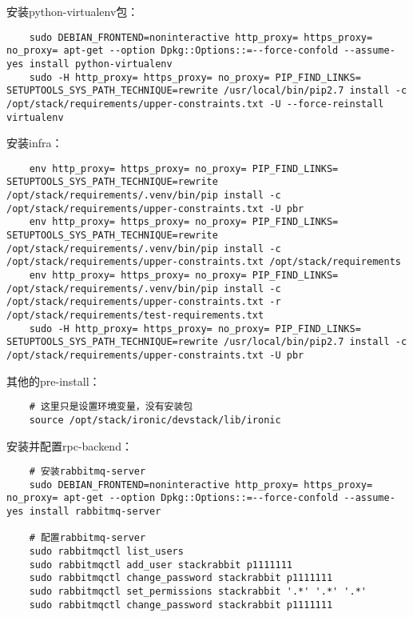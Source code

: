 \documentclass[a4paper,left=1.5cm,right=1.5cm,11pt]{article}
\begin{document}
	安装python-virtualenv包：
	\begin{lstlisting}
	sudo DEBIAN_FRONTEND=noninteractive http_proxy= https_proxy= no_proxy= apt-get --option Dpkg::Options::=--force-confold --assume-yes install python-virtualenv
	sudo -H http_proxy= https_proxy= no_proxy= PIP_FIND_LINKS= SETUPTOOLS_SYS_PATH_TECHNIQUE=rewrite /usr/local/bin/pip2.7 install -c /opt/stack/requirements/upper-constraints.txt -U --force-reinstall virtualenv
	\end{lstlisting}

	安装infra：
	\begin{lstlisting}
	env http_proxy= https_proxy= no_proxy= PIP_FIND_LINKS= SETUPTOOLS_SYS_PATH_TECHNIQUE=rewrite /opt/stack/requirements/.venv/bin/pip install -c /opt/stack/requirements/upper-constraints.txt -U pbr
	env http_proxy= https_proxy= no_proxy= PIP_FIND_LINKS= SETUPTOOLS_SYS_PATH_TECHNIQUE=rewrite /opt/stack/requirements/.venv/bin/pip install -c /opt/stack/requirements/upper-constraints.txt /opt/stack/requirements
	env http_proxy= https_proxy= no_proxy= PIP_FIND_LINKS= /opt/stack/requirements/.venv/bin/pip install -c /opt/stack/requirements/upper-constraints.txt -r /opt/stack/requirements/test-requirements.txt
	sudo -H http_proxy= https_proxy= no_proxy= PIP_FIND_LINKS= SETUPTOOLS_SYS_PATH_TECHNIQUE=rewrite /usr/local/bin/pip2.7 install -c /opt/stack/requirements/upper-constraints.txt -U pbr
	\end{lstlisting}

	其他的pre-install：
	\begin{lstlisting}
	# 这里只是设置环境变量，没有安装包
	source /opt/stack/ironic/devstack/lib/ironic
	\end{lstlisting}

	安装并配置rpc-backend：
	\begin{lstlisting}
	# 安装rabbitmq-server
	sudo DEBIAN_FRONTEND=noninteractive http_proxy= https_proxy= no_proxy= apt-get --option Dpkg::Options::=--force-confold --assume-yes install rabbitmq-server

	# 配置rabbitmq-server
	sudo rabbitmqctl list_users
	sudo rabbitmqctl add_user stackrabbit p1111111
	sudo rabbitmqctl change_password stackrabbit p1111111
	sudo rabbitmqctl set_permissions stackrabbit '.*' '.*' '.*'
	sudo rabbitmqctl change_password stackrabbit p1111111
	\end{lstlisting}
\end{document}
